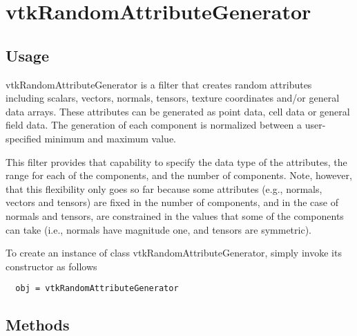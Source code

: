 \section{vtkRandomAttributeGenerator}

\subsection{Usage}

 vtkRandomAttributeGenerator is a filter that creates random attributes
 including scalars, vectors, normals, tensors, texture coordinates and/or
 general data arrays. These attributes can be generated as point data, cell
 data or general field data. The generation of each component is normalized
 between a user-specified minimum and maximum value.

 This filter provides that capability to specify the data type of the
 attributes, the range for each of the components, and the number of
 components. Note, however, that this flexibility only goes so far because
 some attributes (e.g., normals, vectors and tensors) are fixed in the
 number of components, and in the case of normals and tensors, are
 constrained in the values that some of the components can take (i.e., 
 normals have magnitude one, and tensors are symmetric).

To create an instance of class vtkRandomAttributeGenerator, simply
invoke its constructor as follows
\begin{verbatim}
  obj = vtkRandomAttributeGenerator
\end{verbatim}
\subsection{Methods}


